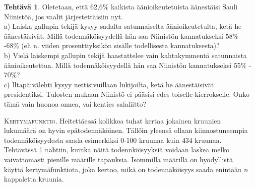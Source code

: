 \documentclass[12pt,leqno,a4paper,oneside]{amsart}
\theoremstyle{definition}
\newtheorem{exercise}{Tehtävä}
\theoremstyle{remark}
\numberwithin{equation}{section}
\begin{document}
\begin{exercise}
\label{kannatustehtava}
 Oletetaan, että 62,6\% kaikista äänioikeutetuista äänestäisi Sauli Niinistöä, jos vaalit järjestettäisiin nyt.\\
 a) Laiska gallupin tekijä kysyy sadalta satunnaiselta äänioikeutetulta, ketä he äänestäisivät. Millä todennäköisyydellä hän saa Niinistön kannatukseksi
 58\% -68\% (eli n. viiden prosenttiyksikön sisälle todellisesta kannatuksesta)?\\
 b) Vielä laiskempi gallupin tekijä haastattelee vain kahtakymmentä sa\-tun\-nais\-ta äänioikeutettua. Millä todennäköisyydellä hän saa Niinistön kannatukseksi
 55\% - 70\%? \\
 c) Iltapäivälehti kysyy nettisivuillaan lukijoilta, ketä he äänestäisivät presidentiksi. Tulosten mukaan Niinistö ei pääsisi edes toiselle kierrokselle.
 Onko tämä vain huonoa onnea, vai kenties salaliitto?
\end{exercise}

\textsc{Kertymäfunktio.} Heitettäessä kolikkoa tuhat kertaa jokainen kruunien lukumäärä on hyvin epätodennäköinen. Tällöin yleensä ollaan kiinnostuneempia
todennäköisyydesta saada esimerkiksi 0-100 kruunaa kuin 434 kruunaa. Tehtävässä \ref{kannatustehtava} nähtiin, kuinka näitä todennköisyyksiä voidaan laskea
melko vaivattomasti pienille määrille tapauksia. Isommilla määrillä on hyödyllistä käyttä kertymäfunktiota, joka kertoo, mikä on todennäköisyys saada
enintään $n$ kappaletta kruunia.
\end{document}
